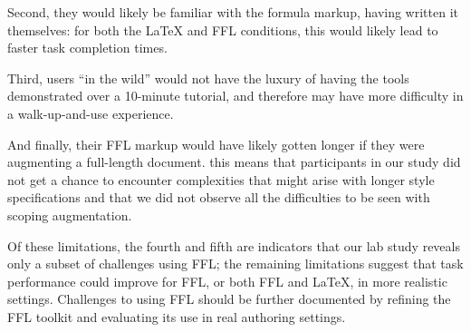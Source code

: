 
Second, they would likely be familiar with the formula markup, having written it themselves: for both the LaTeX and FFL conditions, this would likely lead to faster task completion times.

Third, users ``in the wild'' would not have the luxury of having the tools demonstrated over a 10-minute tutorial, and therefore may have more difficulty in a walk-up-and-use experience.

And finally, their FFL markup would have likely gotten longer if they were augmenting a full-length document. this means that participants in our study did not get a chance to encounter complexities that might arise with longer style specifications and that we did not observe all the difficulties to be seen with scoping augmentation.

Of these limitations, the fourth and fifth are indicators that our lab study reveals only a subset of challenges using FFL; the remaining limitations suggest that task performance could improve for FFL, or both FFL and LaTeX, in more realistic settings. Challenges to using FFL should be further documented by refining the FFL toolkit and evaluating its use in real authoring settings.


